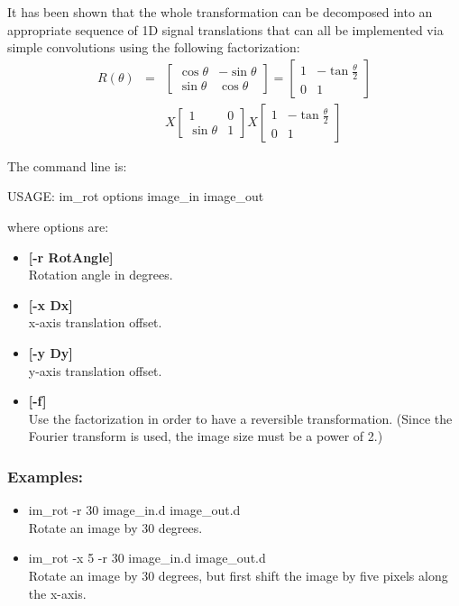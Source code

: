 It has been shown \cite{ima:danielsson92,ima:unser95} that the 
whole transformation can be decomposed into an
appropriate sequence of 1D signal translations that can all be implemented
via simple convolutions using the following factorization:
\begin{eqnarray}
R(\theta)   & = &
\left[\begin{array}{cc}
               \cos \theta &  - \sin \theta  \\
               \sin \theta  & \cos \theta   
       \end{array}
\right]  = \left[\begin{array}{cc}
               1 &  - \tan \frac{\theta}{2} \\
               0  & 1   
       \end{array}
\right]  \nonumber \\  
  &  &  X \left[\begin{array}{cc}
               1 &  0 \\
                \sin \theta  & 1   
       \end{array}
\right]
 X \left[\begin{array}{cc}
               1 &  -\tan \frac{\theta}{2} \\
               0  & 1   
       \end{array}
\right]
\end{eqnarray}

The command line is:
{
\bf
\begin{center}
USAGE: im\_rot options image\_in image\_out
\end{center}}
where options are:
\begin{itemize}
\item {\bf[-r RotAngle]} \\
Rotation angle in degrees.
\item {\bf[-x  Dx]} \\
x-axis translation offset.
\item {\bf[-y  Dy]} \\
y-axis translation offset.
\item {\bf[-f]} \\
Use the factorization in order to have a reversible transformation.
(Since the Fourier transform is used, the image size must be a power of 2.)
\end{itemize}
\subsubsection{Examples:}
\begin{itemize}
\item im\_rot -r 30 image\_in.d image\_out.d \\
Rotate an image by 30 degrees.
\item im\_rot -x 5 -r 30 image\_in.d image\_out.d \\
Rotate an image by 30 degrees, but first shift the image by five pixels
along the x-axis.
\end{itemize}

